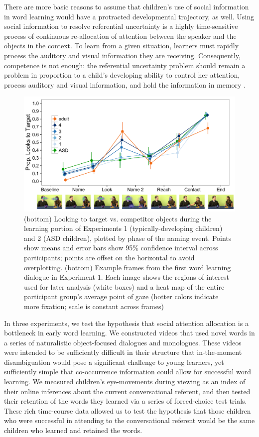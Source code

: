 \documentclass{pnastwo}
\begin{document}
\begin{article}
There are more basic reasons to assume that children's use of social information in word learning would have a protracted developmental trajectory, as well. Using social information to resolve referential uncertainty is a highly time-sensitive process of continuous re-allocation of attention between the speaker and the objects in the context. To learn from a given situation, learners must rapidly process the auditory and visual information they are receiving. Consequently, competence is not enough: the referential uncertainty problem should remain a problem in proportion to a child's developing ability to control her attention, process auditory and visual information, and hold the information in memory \cite{dempster1981, kail1991, gathercole2004}. 

\begin{figure}
        \includegraphics[width=.95\textwidth]{figures/bronto_all.pdf}
	\caption{\label{fig:reflook_learning} (bottom) Looking to target vs. competitor objects during the learning portion of Experiments 1 (typically-developing children) and 2 (ASD children), plotted by phase of the naming event. Points show means and error bars show 95\% confidence interval across participants; points are offset on the horizontal to avoid overplotting. (bottom) Example frames from the first word learning dialogue in Experiment 1. Each image shows the regions of interest used for later analysis (white boxes) and a heat map of the entire participant group's average point of gaze (hotter colors indicate more fixation; scale is constant across frames)}
\end{figure}

In three experiments, we test the hypothesis that social attention allocation is a bottleneck in early word learning. We constructed videos that used novel words in a series of naturalistic object-focused dialogues and monologues. These videos were intended to be sufficiently difficult in their structure that in-the-moment disambiguation would pose a significant challenge to young learners, yet sufficiently simple that co-occurrence information could allow for successful word learning. We measured children's eye-movements during viewing as an index of their online inferences about the current conversational referent, and then tested their retention of the words they learned via a series of forced-choice test trials. These rich time-course data allowed us to test the hypothesis that those children who were successful in attending to the conversational referent would be the same children who learned and retained the words. 


\end{article}
\end{document}
